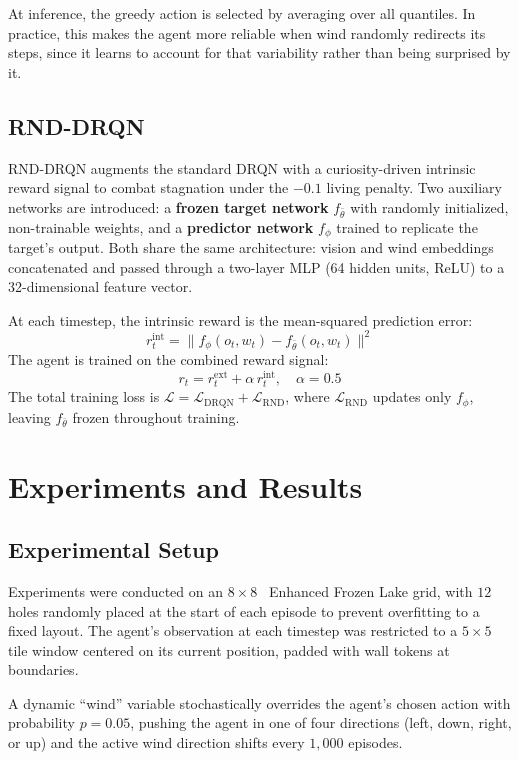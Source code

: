 \documentclass{article}
\begin{document}
At inference, the greedy action is selected by averaging over all quantiles. In practice, this makes the agent more reliable when wind randomly redirects
its steps, since it learns to account for that variability rather than being
surprised by it.

\subsection{RND-DRQN}
RND-DRQN augments the standard DRQN with a curiosity-driven intrinsic reward
signal to combat stagnation under the $-0.1$ living penalty. Two auxiliary
networks are introduced: a \textbf{frozen target network} $f_{\bar{\theta}}$
with randomly initialized, non-trainable weights, and a \textbf{predictor
network} $f_{\phi}$ trained to replicate the target's output. Both share the
same architecture: vision and wind embeddings concatenated and passed through
a two-layer MLP (64 hidden units, ReLU) to a 32-dimensional feature vector.

At each timestep, the intrinsic reward is the mean-squared prediction error: \cite{burda2018}
\[
  r^{\mathrm{int}}_t = \bigl\| f_{\phi}(o_t, w_t) - f_{\bar{\theta}}(o_t, w_t) \bigr\|^2
\]
The agent is trained on the combined reward signal:
\[
  r_t = r^{\mathrm{ext}}_t + \alpha\, r^{\mathrm{int}}_t, \quad \alpha = 0.5
\]
The total training loss is $\mathcal{L} = \mathcal{L}_{\mathrm{DRQN}} + \mathcal{L}_{\mathrm{RND}}$,
where $\mathcal{L}_{\mathrm{RND}}$ updates only $f_{\phi}$, leaving $f_{\bar\theta}$ frozen throughout training.


\section{Experiments and Results}

\subsection{Experimental Setup}
Experiments were conducted on an $8 \times 8$ \ Enhanced Frozen Lake grid, with $12$ holes randomly placed at the start of each episode to prevent overfitting to a fixed layout. The agent's observation at each timestep was restricted to a $5 \times 5$ tile window centered on its current position, padded with wall tokens at boundaries. 

A dynamic ``wind'' variable stochastically overrides the agent's chosen action with probability $p = 0.05$, pushing the agent in one of four directions (left, down, right, or up) and the active wind direction shifts every $1,000$ episodes. 
\end{document}
